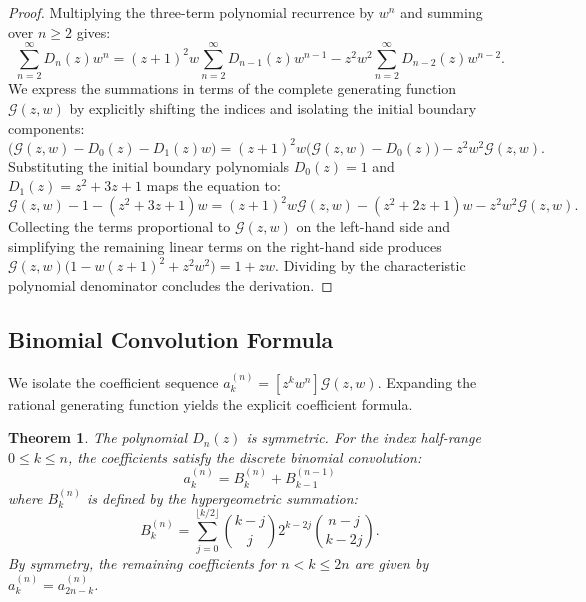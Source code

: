 \documentclass[11pt]{article}
\newtheorem{theorem}{Theorem}[section]
\begin{document}
\begin{proof}
Multiplying the three-term polynomial recurrence by $w^n$ and summing over $n \ge 2$ gives:
\begin{equation*}
\sum_{n=2}^\infty D_n(z)w^n = (z+1)^2 w \sum_{n=2}^\infty D_{n-1}(z)w^{n-1} - z^2 w^2 \sum_{n=2}^\infty D_{n-2}(z)w^{n-2}.
\end{equation*}
We express the summations in terms of the complete generating function $\mathcal{G}(z,w)$ by explicitly shifting the indices and isolating the initial boundary components:
\begin{equation*}
\big(\mathcal{G}(z,w) - D_0(z) - D_1(z)w\big) = (z+1)^2 w \big(\mathcal{G}(z,w) - D_0(z)\big) - z^2 w^2 \mathcal{G}(z,w).
\end{equation*}
Substituting the initial boundary polynomials $D_0(z) = 1$ and $D_1(z) = z^2+3z+1$ maps the equation to:
\begin{equation*}
\mathcal{G}(z,w) - 1 - (z^2+3z+1)w = (z+1)^2 w \mathcal{G}(z,w) - (z^2+2z+1)w - z^2 w^2 \mathcal{G}(z,w).
\end{equation*}
Collecting the terms proportional to $\mathcal{G}(z,w)$ on the left-hand side and simplifying the remaining linear terms on the right-hand side produces $\mathcal{G}(z,w)\big(1 - w(z+1)^2 + z^2w^2\big) = 1 + zw$. Dividing by the characteristic polynomial denominator concludes the derivation.
\end{proof}

\subsection{Binomial Convolution Formula}

We isolate the coefficient sequence $a_k^{(n)} = [z^k w^n] \mathcal{G}(z,w)$. Expanding the rational generating function yields the explicit coefficient formula.

\begin{theorem}\label{thm:binomial_sum}
The polynomial $D_n(z)$ is symmetric. For the index half-range $0 \le k \le n$, the coefficients satisfy the discrete binomial convolution:
\begin{equation}
a_k^{(n)} = B_k^{(n)} + B_{k-1}^{(n-1)}
\end{equation}
where $B_k^{(n)}$ is defined by the hypergeometric summation:
\begin{equation}
B_k^{(n)} = \sum_{j=0}^{\lfloor k/2 \rfloor} \binom{k-j}{j} 2^{k-2j} \binom{n-j}{k-2j}.
\end{equation}
By symmetry, the remaining coefficients for $n < k \le 2n$ are given by $a_k^{(n)} = a_{2n-k}^{(n)}$.
\end{theorem}
\end{document}
